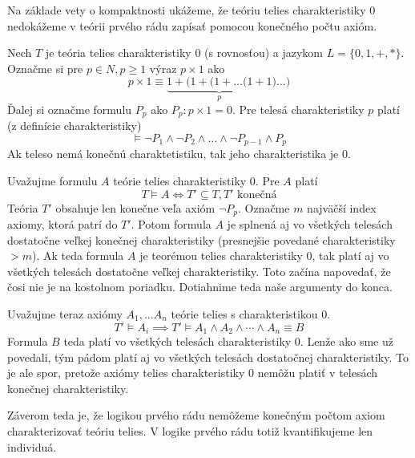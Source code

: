 \begin{priklad}
    Na základe vety o kompaktnosti ukážeme, že teóriu telies
    charakteristiky 0 nedokážeme v teórii prvého rádu zapísať
    pomocou konečného počtu axióm.

    Nech $T$ je teória telies charakteristiky 0 (s rovnosťou)
    a jazykom $L=\{0,1,+,*\}$.    
    Označme si pre $p\in N, p\ge 1$ výraz $p \times 1$ ako
    \begin{equation*}
        p \times 1 \equiv \underbrace{1 + (1 + ( 1 + \dots (1 + 1}_{p}) \dots )
    \end{equation*}
    Ďalej si označme formulu $P_p$ ako $P_p: p \times 1 = 0$.
    Pre telesá charakteristiky $p$ platí (z definície charakteristiky)
    \begin{equation*}
     \models \neg P_1 \land \neg P_2 \land \dots \land \neg P_{p-1}
        \land P_p
    \end{equation*}
    Ak teleso nemá konečnú charaktetistiku, tak jeho charakteristika
    je 0.

    Uvažujme formulu $A$ teórie telies charakteristiky 0. Pre $A$ platí
    \begin{equation*}
     T \models A \iff T' \subseteq T, T'\mbox{ konečná}
    \end{equation*}
    Teória $T'$ obsahuje len konečne veľa axióm $\neg P_p$.
    Označme $m$ najväčší index axiomy, ktorá patrí do $T'$.
    Potom formula $A$ je splnená aj vo všetkých telesách dostatočne
    veľkej konečnej charakteristiky 
    (presnejšie povedané charakteristiky $>m$).
    Ak teda formula $A$ je teorémou telies charakteristiky $0$,
    tak platí aj vo všetkých telesách dostatočne veľkej charakteristiky.
    Toto začína napovedať, že čosi nie je na kostolnom poriadku.
    Dotiahnime teda naše argumenty do konca.

    Uvažujme teraz axiómy $A_1, \dots A_n$ teórie telies s
    charakteristikou 0.
    \begin{equation*}
        T' \models A_i \implies T' \models A_1 \land A_2 \land \cdots
        \land A_n \equiv B
    \end{equation*}
    Formula $B$ teda platí vo všetkých telesách charakteristiky 0.
    Lenže ako sme už povedali, tým pádom platí aj vo všetkých telesách
    dostatočnej charakteristiky. To je ale spor, pretože axiómy telies
    charakteristiky 0 nemôžu platiť v telesách konečnej
    charakteristiky.

    Záverom teda je, že logikou prvého rádu nemôžeme 
    konečným počtom axiom charakterizovať teóriu telies.
    V logike prvého rádu totiž kvantifikujeme len individuá.
\end{priklad}

